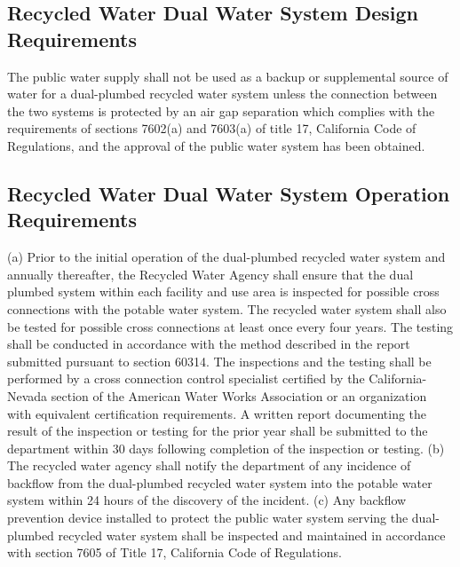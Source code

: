 \subsection{Recycled Water Dual Water System Design Requirements} 

The public water supply shall not be used as a backup or supplemental source of water for a dual-plumbed recycled water system unless the connection between the two systems is protected by an air gap separation which complies with the requirements of sections 7602(a) and 7603(a) of title 17, California Code of Regulations, and the approval of the public water system has been obtained.


\subsection{Recycled Water Dual Water System Operation Requirements} 
(a) Prior to the initial operation of the dual-plumbed recycled water system and annually thereafter, the Recycled Water Agency shall ensure that the dual plumbed system within each facility and use area is inspected for possible cross connections with the potable water system. The recycled water system shall also be tested for possible cross connections at least once every four years. The testing shall be conducted in accordance with the method described in the report submitted pursuant to section 60314. The inspections and the testing shall be performed by a cross connection control specialist certified by the California-Nevada section of the American Water Works Association or an organization with equivalent certification requirements. A written report documenting the result of the inspection or testing for the prior year shall be submitted to the department within 30 days following completion of the inspection or testing.
(b) The recycled water agency shall notify the department of any incidence of backflow from the dual-plumbed recycled water system into the potable water system within 24 hours of the discovery of the incident.
(c) Any backflow prevention device installed to protect the public water system serving the dual-plumbed recycled water system shall be inspected and maintained in accordance with section 7605 of Title 17, California Code of Regulations.